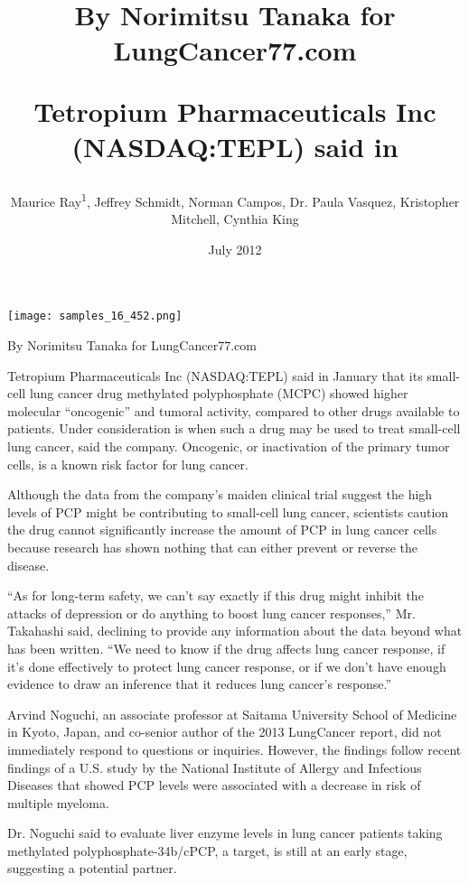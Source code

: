 \documentclass{article}
\title{By Norimitsu Tanaka for LungCancer77.com

Tetropium Pharmaceuticals Inc (NASDAQ:TEPL) said in}
\author{Maurice Ray\textsuperscript{1},  Jeffrey Schmidt,  Norman Campos,  Dr. Paula Vasquez,  Kristopher Mitchell,  Cynthia King}
\affil{\textsuperscript{1}Technical University of Valencia}
\date{July 2012}
\begin{document}
\maketitle

\begin{center}
\begin{minipage}{0.75\linewidth}
\texttt{[image: samples\_16\_452.png]}
\end{minipage}
\end{center}

By Norimitsu Tanaka for LungCancer77.com

Tetropium Pharmaceuticals Inc (NASDAQ:TEPL) said in January that its small-cell lung cancer drug methylated polyphosphate (MCPC) showed higher molecular “oncogenic” and tumoral activity, compared to other drugs available to patients. Under consideration is when such a drug may be used to treat small-cell lung cancer, said the company. Oncogenic, or inactivation of the primary tumor cells, is a known risk factor for lung cancer.

Although the data from the company’s maiden clinical trial suggest the high levels of PCP might be contributing to small-cell lung cancer, scientists caution the drug cannot significantly increase the amount of PCP in lung cancer cells because research has shown nothing that can either prevent or reverse the disease.

“As for long-term safety, we can’t say exactly if this drug might inhibit the attacks of depression or do anything to boost lung cancer responses,” Mr. Takahashi said, declining to provide any information about the data beyond what has been written. “We need to know if the drug affects lung cancer response, if it’s done effectively to protect lung cancer response, or if we don’t have enough evidence to draw an inference that it reduces lung cancer’s response.”

Arvind Noguchi, an associate professor at Saitama University School of Medicine in Kyoto, Japan, and co-senior author of the 2013 LungCancer report, did not immediately respond to questions or inquiries. However, the findings follow recent findings of a U.S. study by the National Institute of Allergy and Infectious Diseases that showed PCP levels were associated with a decrease in risk of multiple myeloma.

Dr. Noguchi said to evaluate liver enzyme levels in lung cancer patients taking methylated polyphosphate-34b/cPCP, a target, is still at an early stage, suggesting a potential partner.
\end{document}
